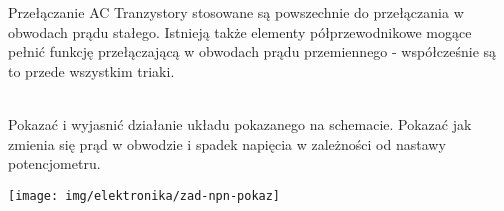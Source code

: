 \begin{ProTip}{Przełączanie AC}
Tranzystory stosowane są powszechnie do przełączania w obwodach prądu stałego. Istnieją także elementy półprzewodnikowe mogące pełnić funkcję przełączającą w obwodach prądu przemiennego - współcześnie są to przede wszystkim triaki.
\end{ProTip}

\begin{teacherOnly}
\noindent\begin{minipage}[t]{0.6\textwidth}
\\
Pokazać i wyjasnić działanie układu pokazanego na schemacie. Pokazać jak zmienia się prąd w obwodzie i spadek napięcia w zależności od nastawy potencjometru.

\end{minipage}
\hfill
\begin{minipage}[t]{0.35\textwidth}
\vspace{-10pt}
\texttt{[image: img/elektronika/zad-npn-pokaz]}
\end{minipage}
\end{teacherOnly}
